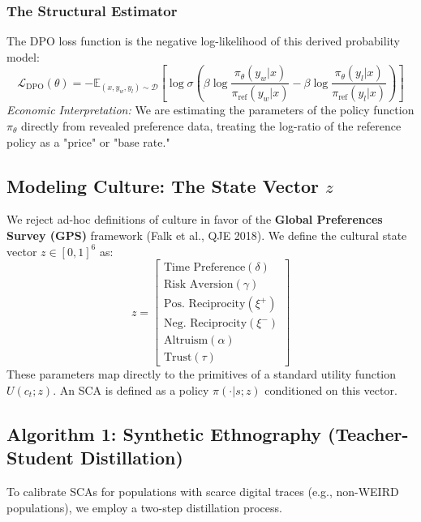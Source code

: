 \subsubsection{The Structural Estimator}
The DPO loss function is the negative log-likelihood of this derived probability model:
\begin{equation}
    \mathcal{L}_{\text{DPO}}(\theta) = -\mathbb{E}_{(x, y_w, y_l) \sim \mathcal{D}} \left[ \log \sigma \left( \beta \log \frac{\pi_\theta(y_w|x)}{\pi_{\text{ref}}(y_w|x)} - \beta \log \frac{\pi_\theta(y_l|x)}{\pi_{\text{ref}}(y_l|x)} \right) \right]
\end{equation}
\textit{Economic Interpretation:} We are estimating the parameters of the policy function $\pi_\theta$ directly from revealed preference data, treating the log-ratio of the reference policy as a "price" or "base rate."

\subsection{Modeling Culture: The State Vector $z$}
We reject ad-hoc definitions of culture in favor of the \textbf{Global Preferences Survey (GPS)} framework (Falk et al., QJE 2018). We define the cultural state vector $z \in [0,1]^6$ as:
\begin{equation}
    z = \begin{bmatrix} 
    \text{Time Preference} (\delta) \\ 
    \text{Risk Aversion} (\gamma) \\ 
    \text{Pos. Reciprocity} (\xi^+) \\ 
    \text{Neg. Reciprocity} (\xi^-) \\ 
    \text{Altruism} (\alpha) \\ 
    \text{Trust} (\tau)
    \end{bmatrix}
\end{equation}
These parameters map directly to the primitives of a standard utility function $U(c_t; z)$. An SCA is defined as a policy $\pi(\cdot|s; z)$ conditioned on this vector.

\subsection{Algorithm 1: Synthetic Ethnography (Teacher-Student Distillation)}\label{sec:algo}
To calibrate SCAs for populations with scarce digital traces (e.g., non-WEIRD populations), we employ a two-step distillation process.

